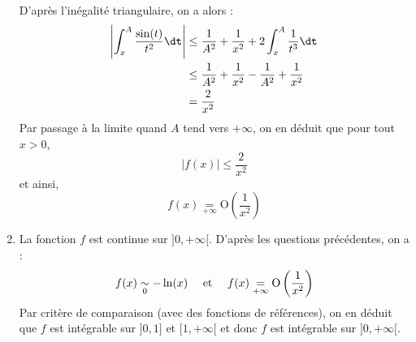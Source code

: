 \documentclass[a4paper,10pt]{report}
\begin{document}
\begin{enumerate}
\begin{align*}
  \end{align*}
 D'après l'inégalité triangulaire, on a alors :
 \begin{align*}
 \left\vert  \int_{x}^A \dfrac{\sin(t)}{t^2} \dt \right\vert & \leq \dfrac{1}{A^2} + \dfrac{1}{x^2} + 2 \int_{x}^A \dfrac{1}{t^3} \dt  \\
 & \leq \dfrac{1}{A^2} + \dfrac{1}{x^2} - \dfrac{1}{A^2} + \dfrac{1}{x^2}  \\
 & = \dfrac{2}{x^2}
 \end{align*}
 Par passage à la limite quand $A$ tend vers $+ \infty$, on en déduit que pour tout $x>0$,
 $$ \vert f(x) \vert \leq \dfrac{2}{x^2}$$
 et ainsi,
$$f(x) \underset{+ \infty}{=} \textrm{O} \left( \dfrac{1}{x^2} \right) $$
\item La fonction $f$ est continue sur $]0, + \infty[$. D'après les questions précédentes, on a :
$$ f(x) \underset{0}{\sim} -\ln(x) \quad \hbox{ et } \quad f(x) \underset{+ \infty}{=} \textrm{O} \left( \dfrac{1}{x^2} \right)$$
Par critère de comparaison (avec des fonctions de références), on en déduit que $f$ est intégrable sur $]0,1]$ et $[1, + \infty[$ et donc $f$ est intégrable sur $]0, + \infty[$.
\end{enumerate}
\end{document}
